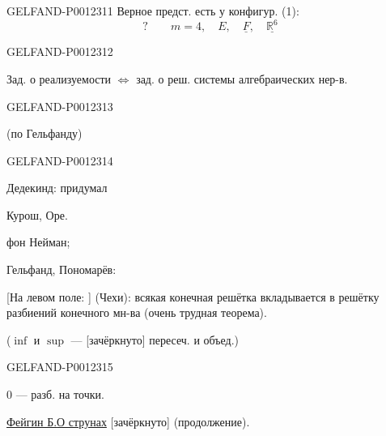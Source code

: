 \begin{GelfandAdjacentEvidence}{GELFAND-P001231}{1}
Верное предст. есть у конфигур. (1):
\begin{equation*}
?\qquad m=4,\quad E,\quad \underline F,\quad \underline{\mathbb R^6}
\end{equation*}
\end{GelfandAdjacentEvidence}
\begin{GelfandAdjacentEvidence}{GELFAND-P001231}{2}


Зад. о реализуемости \(\Leftrightarrow\) зад. о реш. системы алгебраических нер-в.
\end{GelfandAdjacentEvidence}
\begin{GelfandAdjacentEvidence}{GELFAND-P001231}{3}


 (по Гельфанду)
\end{GelfandAdjacentEvidence}
\begin{GelfandAdjacentEvidence}{GELFAND-P001231}{4}


Дедекинд: придумал

Курош, Оре.

фон Нейман;

Гельфанд, Пономарёв:

[На левом поле: ]
 (Чехи): всякая конечная решётка вкладывается в решётку разбиений конечного мн-ва (очень трудная теорема).

(\(\inf\) и \(\sup\) --- [зачёркнуто] пересеч. и объед.)
\end{GelfandAdjacentEvidence}
\begin{GelfandAdjacentEvidence}{GELFAND-P001231}{5}


\(0\) --- разб. на точки.

\medskip
\underline{\underline{Фейгин Б.}}\qquad\underline{О струнах} [зачёркнуто] (продолжение).
\end{GelfandAdjacentEvidence}
